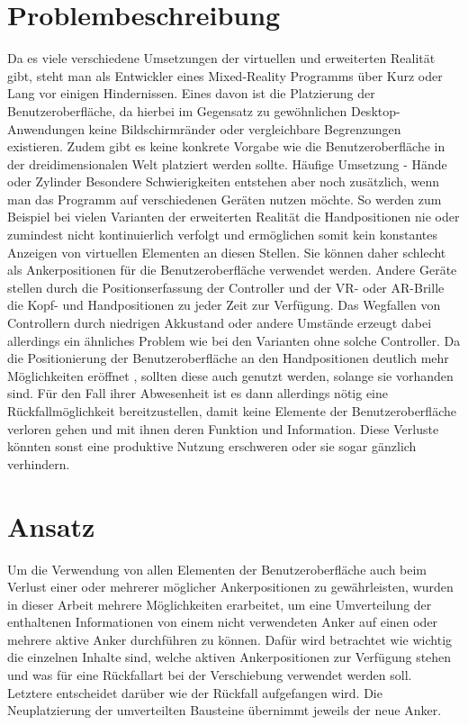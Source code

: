 	\section{Problembeschreibung}
		Da es viele verschiedene Umsetzungen der virtuellen und erweiterten Realität gibt, steht man als Entwickler eines Mixed-Reality Programms über Kurz oder Lang vor einigen Hindernissen. Eines davon ist die Platzierung der Benutzeroberfläche, da hierbei im Gegensatz zu gewöhnlichen Desktop-Anwendungen keine Bildschirmränder oder vergleichbare Begrenzungen existieren.
		Zudem gibt es keine konkrete Vorgabe wie die Benutzeroberfläche in der dreidimensionalen Welt platziert werden sollte. 
		Häufige Umsetzung - Hände oder Zylinder
		Besondere Schwierigkeiten entstehen aber noch zusätzlich, wenn man das Programm auf verschiedenen Geräten nutzen möchte. So werden zum Beispiel bei vielen Varianten der erweiterten Realität die Handpositionen nie oder zumindest nicht kontinuierlich verfolgt und ermöglichen somit kein konstantes Anzeigen von virtuellen Elementen an diesen Stellen. Sie können daher schlecht als Ankerpositionen für die Benutzeroberfläche verwendet werden.
		Andere Geräte stellen durch die Positionserfassung der Controller und der VR- oder AR-Brille die Kopf- und Handpositionen zu jeder Zeit zur Verfügung. Das Wegfallen von Controllern durch niedrigen Akkustand oder andere Umstände erzeugt dabei allerdings ein ähnliches Problem wie bei den Varianten ohne solche Controller.
		Da die Positionierung der Benutzeroberfläche an den Handpositionen deutlich mehr Möglichkeiten eröffnet , sollten diese auch genutzt werden, solange sie vorhanden sind. Für den Fall ihrer Abwesenheit ist es dann allerdings nötig eine Rückfallmöglichkeit bereitzustellen, damit keine Elemente der Benutzeroberfläche verloren gehen und mit ihnen deren Funktion und Information. Diese Verluste könnten sonst eine produktive Nutzung erschweren oder sie sogar gänzlich verhindern.
		
	\section{Ansatz}
		Um die Verwendung von allen Elementen der Benutzeroberfläche auch beim Verlust einer oder mehrerer möglicher Ankerpositionen zu gewährleisten, wurden in dieser Arbeit mehrere Möglichkeiten erarbeitet, um eine Umverteilung der enthaltenen Informationen von einem nicht verwendeten Anker auf einen oder mehrere aktive Anker durchführen zu können.
		Dafür wird betrachtet wie wichtig die einzelnen Inhalte sind, welche aktiven Ankerpositionen zur Verfügung stehen und was für eine Rückfallart bei der Verschiebung verwendet werden soll. Letztere entscheidet darüber wie der Rückfall aufgefangen wird.
		Die Neuplatzierung der umverteilten Bausteine übernimmt jeweils der neue Anker.
		
